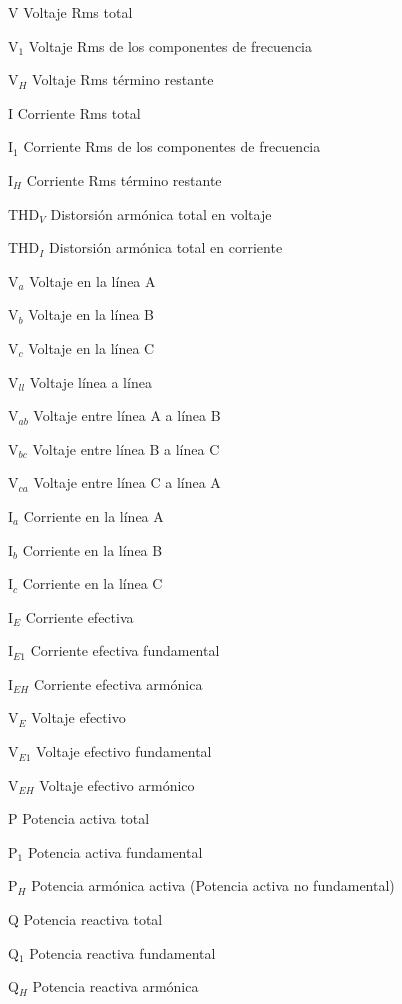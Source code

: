 \begin{abbrv}
\item[V]			Voltaje Rms total
\item[V$_{1}$]		Voltaje Rms de los componentes de frecuencia
\item[V$_{H}$]		Voltaje Rms término restante
\item[I]			Corriente Rms total
\item[I$_{1}$]		Corriente Rms de los componentes de frecuencia
\item[I$_{H}$]		Corriente Rms término restante

\item[THD$_{V}$]		Distorsión armónica total en  voltaje
\item[THD$_{I}$]		Distorsión armónica total en corriente
\item[V$_{a}$]      Voltaje en la línea A
\item[V$_{b}$]      Voltaje en la línea B
\item[V$_{c}$]      Voltaje en la línea C
\item[V$_{ll}$]     Voltaje línea a línea
\item[V$_{ab}$]      Voltaje entre línea A a línea B
\item[V$_{bc}$]      Voltaje entre línea B a línea C
\item[V$_{ca}$]      Voltaje entre línea C a línea A 
\item[I$_{a}$]      Corriente en la línea A
\item[I$_{b}$]      Corriente en la línea B
\item[I$_{c}$]      Corriente en la línea C

\item[I$_{E}$]		Corriente efectiva
\item[I$_{E1}$]		Corriente efectiva fundamental
\item[I$_{EH}$]		Corriente efectiva armónica
\item[V$_{E}$]		Voltaje efectivo
\item[V$_{E1}$]		Voltaje efectivo fundamental
\item[V$_{EH}$]		Voltaje efectivo armónico

\item[P]			Potencia activa total
\item[P$_{1}$]		Potencia activa fundamental
\item[P$_{H}$]		Potencia armónica activa (Potencia activa no fundamental)

\item[Q]		Potencia reactiva total
\item[Q$_{1}$]		Potencia reactiva fundamental
\item[Q$_{H}$]		Potencia reactiva armónica


\end{abbrv}
